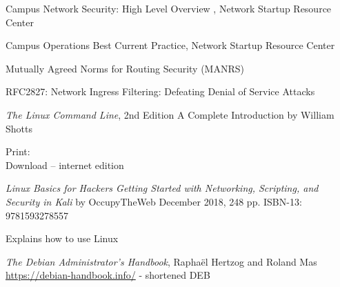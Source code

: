 \documentclass[Screen16to9,17pt]{foils}
\begin{document}
\myquestionspage


\begin{list2}
\item Campus Network Security: High Level Overview , Network Startup Resource Center

\item Campus Operations Best Current Practice, Network Startup Resource Center

\item Mutually Agreed Norms for Routing Security (MANRS)

\item RFC2827: Network Ingress Filtering: Defeating Denial of Service Attacks
\end{list2}



\emph{The Linux Command Line}, 2nd Edition
A Complete Introduction by William Shotts

Print: \\
Download -- internet edition 




\emph{Linux Basics for Hackers
Getting Started with Networking, Scripting, and Security in Kali}
by OccupyTheWeb
December 2018, 248 pp.
ISBN-13:
9781593278557

Explains how to use Linux



\emph{The Debian Administrator’s Handbook}, Raphaël Hertzog and Roland Mas\\
\url{https://debian-handbook.info/} - shortened DEB
\end{document}
